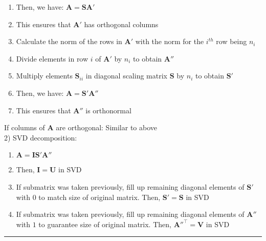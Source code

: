 \begin{itemize}
\begin{enumerate}
        \item Then, we have: $\boldsymbol{A} = \boldsymbol{S}\boldsymbol{A}'$
        \item This ensures that $\boldsymbol{A}'$ has orthogonal columns
        \item Calculate the norm of the rows in $\boldsymbol{A}'$ with the norm for the $i^{th}$ row being $n_i$
        \item Divide elements in row $i$ of $\boldsymbol{A}'$ by $n_i$ to obtain $\boldsymbol{A}''$
        \item Multiply elements $\boldsymbol{S}_{ii}$ in diagonal scaling matrix $\boldsymbol{S}$ by $n_i$ to obtain $\boldsymbol{S}'$ 
        \item Then, we have: $\boldsymbol{A} = \boldsymbol{S}'\boldsymbol{A}''$
        \item This ensures that $\boldsymbol{A}''$ is orthonormal
    \end{enumerate}
    If columns of $\boldsymbol{A}$ are orthogonal: Similar to above\\
    2) SVD decomposition:
    \begin{enumerate}
        \item $\boldsymbol{A} = \boldsymbol{I}\boldsymbol{S}'\boldsymbol{A}''$
        \item Then, $\boldsymbol{I} = \boldsymbol{U}$ in SVD
        \item If submatrix was taken previously, fill up remaining diagonal elements of $\boldsymbol{S}'$ with $0$ to match size of original matrix. Then, $\boldsymbol{S}' = \boldsymbol{S}$ in SVD
        \item If submatrix was taken previously, fill up remaining diagonal elements of $\boldsymbol{A}''$ with $1$ to guarantee size of original matrix. Then, $\boldsymbol{A}''^\intercal = \boldsymbol{V}$ in SVD
    \end{enumerate}
\end{itemize}

{\color{lightgray}\hrule height 0.001mm}

